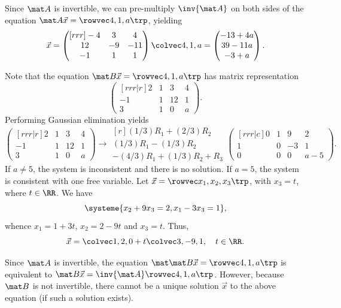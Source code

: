 \begin{solution}
    \begin{ppart}
        Since $\mat A$ is invertible, we can pre-multiply $\inv{\mat A}$ on both sides of the equation $\mat A \vec x = \cveciiix41a$, yielding \[\vec x = \begin{pmatrix}[rrr]-4 & 3 & 4 \\ 12 & -9 & -11 \\ -1 & 1 & 1\end{pmatrix} \cveciii41a = \begin{pmatrix}-13 + 4a \\ 39 - 11 a \\ -3 + a\end{pmatrix}.\]
    \end{ppart}
    \begin{ppart}
        Note that the equation $\mat B \vec x = \cveciiix41a$ has matrix representation \[\begin{pmatrix}[rrr|r]2 & 1 & 3 & 4 \\ -1 & 1 & 12 & 1 \\ 3 & 1 & 0 & a\end{pmatrix}.\] Performing Gaussian elimination yields \[\begin{pmatrix}[rrr|r]2 & 1 & 3 & 4 \\ -1 & 1 & 12 & 1 \\ 3 & 1 & 0 & a\end{pmatrix} \rightarrow \begin{matrix}[r]\scriptstyle(1/3) R_1 + (2/3) R_2 \\ \scriptstyle(1/3) R_1 - (1/3) R_2 \\ \scriptstyle-(4/3) R_1 + (1/3) R_2 + R_3\end{matrix} \begin{pmatrix}[rrr|c]0 & 1 & 9 & 2 \\ 1 & 0 & -3 & 1 \\ 0 & 0 & 0 & a-5\end{pmatrix}.\] If $a \neq 5$, the system is inconsistent and there is no solution. If $a = 5$, the system is consistent with one free variable. Let $\vec x = \cveciiix{x_1}{x_2}{x_3}$, with $x_3 = t$, where $t \in \RR$. We have \[\systeme{x_2 + 9x_3 = 2, x_1 - 3x_3 = 1},\] whence $x_1 = 1 + 3t$, $x_2 = 2-9t$ and $x_3 = t$. Thus, \[\vec x = \cveciii120 + t \cveciii3{-9}1, \quad t \in \RR.\]
    \end{ppart}

    Since $\mat A$ is invertible, the equation $\mat \mat B \vec x = \cveciiix41a$ is equivalent to $\mat B \vec x = \inv{\mat A} \cveciiix41a$. However, because $\mat B$ is not invertible, there cannot be a unique solution $\vec x$ to the above equation (if such a solution exists).
\end{solution}

